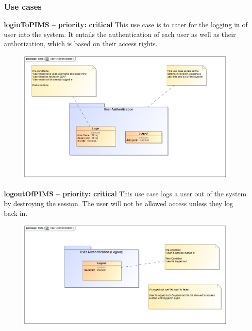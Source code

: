 \subsubsection{Use cases}
\begin{description}
	\item{\textbf{loginToPIMS -- priority: critical}}\hfill
	This use case is to cater for the logging in of user into the system. It entails the authentication of each user as well as their authorization, which is based on their access rights.
		\begin{figure}[h!]
			\includegraphics[width=0.7\linewidth]{./Graphics/Login}
		\end{figure}
	\item{\textbf{logoutOfPIMS -- priority: critical}}\hfill
	This use case logs a user out of the system by destroying the session. The user will not be allowed access unless they log back in.
		\begin{figure}[h!]
			\includegraphics[width=0.7\linewidth]{./Graphics/Logout}
		\end{figure}
\end{description}
